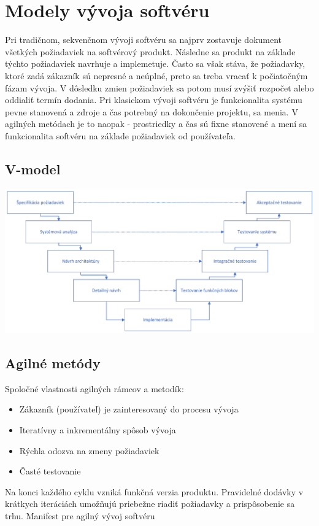 \documentclass[10pt,twoside,slovak,a4paper]{article}
\begin{document}
\section{Modely vývoja softvéru}
Pri tradičnom, sekvenčnom vývoji softvéru sa najprv zostavuje dokument všetkých požiadaviek na softvérový produkt. Následne sa produkt na základe týchto požiadaviek navrhuje a implemetuje. Často sa však stáva, že požiadavky, ktoré zadá zákazník sú nepresné a neúplné, preto sa treba vracať k počiatočným fázam vývoja. V dôsledku zmien požiadaviek sa potom musí zvýšiť rozpočet alebo oddialiť termín dodania. 
Pri klasickom vývoji softvéru je funkcionalita systému pevne stanovená a zdroje a čas potrebný na dokončenie projektu, sa menia. V agilných metódach je to naopak - prostriedky a čas sú fixne stanovené a mení sa funkcionalita softvéru na základe požiadaviek od používateľa.
\subsection{V-model}
\includegraphics[width=1\textwidth]{v.pdf}

\subsection{Agilné metódy}
Spoločné vlastnosti agilných rámcov a metodík:
\begin{itemize}
\item Zákazník (používateľ) je zainteresovaný do procesu vývoja
\item Iteratívny a inkrementálny spôsob vývoja 
\item Rýchla odozva na zmeny požiadaviek
\item Časté testovanie
\end{itemize}
Na konci každého cyklu vzniká funkčná verzia produktu. Pravidelné dodávky v krátkych iteráciách umožňujú priebežne riadiť požiadavky a prispôsobenie sa trhu. 
Manifest pre agilný vývoj softvéru
\end{document}

